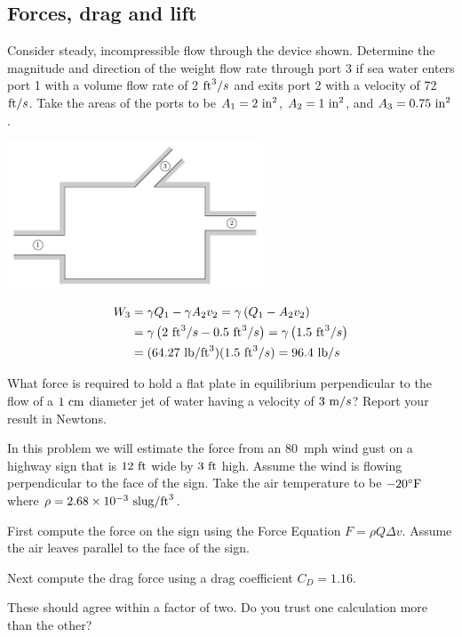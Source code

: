 \documentclass[12pt]{article}
\begin{document}
\begin{center}
\section*{Forces, drag and lift}
\end{center}

\begin{question}

Consider steady, incompressible flow through the device shown.  Determine the magnitude and direction of the weight flow rate through port 3 if sea water enters port 1 with a volume flow rate of 2 $\mathrm{ft}^3/s$ and exits port 2 with a velocity of 72 $\mathrm{ft}/s$.  Take the areas of the ports to be $A_1=2~\mathrm{in}^2$, $A_2=1~\mathrm{in}^2$, and $A_3=0.75~\mathrm{in}^2$.

\includegraphics[width=3in]{imgs/continuity.pdf}

\begin{solution}
\begin{align*}
W_3 &=\gamma Q_1-\gamma A_2 v_2=\gamma\left(Q_1-A_2 v_2\right) \\
&=\gamma\left(2~\mathrm{ft}^3/s-0.5~\mathrm{ft}^3/s\right)=\gamma \left(1.5~\mathrm{ft}^3/s\right)\\
&=(64.27~\mathrm{lb}/\mathrm{ft}^3)(1.5~\mathrm{ft}^3/s)=96.4~\mathrm{lb}/s
\end{align*}
\end{solution}

\end{question}


\begin{question}

What force is required to hold a flat plate in equilibrium perpendicular to the flow of a $1~\mathrm{cm}$ diameter jet of water having a velocity of $3~\mathrm{m}/s$?  Report your result in Newtons.

\end{question}

\begin{question}

In this problem we will estimate the force from an 80~mph wind gust on a highway sign that is $12~\mathrm{ft}$ wide by $3~\mathrm{ft}$ high.  Assume the wind is flowing perpendicular to the face of the sign.  Take the air temperature to be $-20^\circ\mathrm{F}$ where $\rho=2.68\times 10^{-3}~\mathrm{slug}/\mathrm{ft}^3$.

First compute the force on the sign using the Force Equation $F=\rho Q \Delta v$.  Assume the air leaves parallel to the face of the sign.

Next compute the drag force using a drag coefficient $C_D=1.16$.

These should agree within a factor of two.  Do you trust one calculation more than the other?

\end{question}
\end{document}
